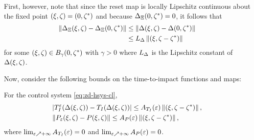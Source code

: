 First, however, note that since the reset map is locally Lipschitz continuous
about the fixed point $(\xi, \zeta) = (0, \zeta^{*})$ and because $\Delta_{\Xi}(0, \zeta^{*}) = 0$, it
follows that
%
\begin{align} 
  \nonumber
  \left\| \Delta_{\Xi}(\xi, \zeta) - \Delta_{\Xi}(0, \zeta^{*}) \right\| &\leq \left\| \Delta(\xi, \zeta) -
    \Delta(0, \zeta^{*}) \right\|
  \\
  \label{eq:impact-Lipschitz}
  &\leq L_{\Delta} \left\|(\xi, \zeta - \zeta^{*})\right\|
\end{align}
%
for some $(\xi, \zeta) \in B_{\gamma}(0, \zeta^{*})$ with $\gamma > 0$ where $L_{\Delta}$ is the
Lipschitz constant of $\Delta(\xi, \zeta)$.

Now, consider the following bounds on the time-to-impact functions and
\Poincare{} maps:

\begin{lemma}
  \label{lemma:TIe-P-bounds}
  For the control system \eqref{eq:zd-hsys-cl},
  \begin{eqnarray*}
    &| T_{I}^{\varepsilon}(\Delta(\xi, \zeta)) - T_{I}(\Delta(\xi, \zeta)) | \leq A_{T_{I}}(\varepsilon) \left\|(\xi, \zeta - \zeta^{*})\right\|,\\
    &\| P_{\varepsilon}(\xi, \zeta) - P(\xi, \zeta) \| \leq A_{P}(\varepsilon) \left\|(\xi, \zeta - \zeta^{*})\right\|,
  \end{eqnarray*}
  where $\lim_{\varepsilon \nearrow +\infty} A_{T_{I}}(\varepsilon) = 0$ and $\lim_{\varepsilon \nearrow +\infty}A_{P}(\varepsilon) = 0$.\vgap
\end{lemma}
